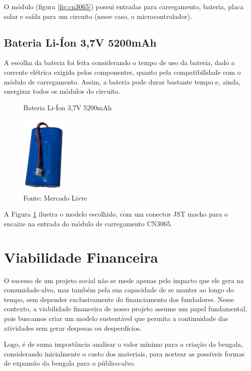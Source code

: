     O módulo (figura \ref{fig:cn3065}) possui entradas para carregamento, bateria, placa solar e saída para um circuito (nesse caso, o microcontrolador). 
    
    \subsection{Bateria Li-Íon 3,7V 5200mAh}
    A escolha da bateria foi feita considerando o tempo de uso da bateria, dado a corrente elétrica exigida pelos componentes, quanto pela compatibilidade com o módulo de carregamento. Assim, a bateria pode durar bastante tempo e, ainda, energizar todos os módulos do circuito.

     \begin{figure}[h!]
        \captionsetup{width=1\textwidth}
        \caption{\label{fig:bateria}Bateria Li-Íon 3,7V 5200mAh}
        \centering
        \includegraphics[width=0.2\textwidth]{figuras/bateria} 
        \caption*{Fonte: Mercado Livre}
    \end{figure}

    A Figura \ref{fig:bateria} ilustra o modelo escolhido, com um conector JST macho para o encaixe na entrada do módulo de carregamento CN3065.

    \section{Viabilidade Financeira}
    O sucesso de um projeto social não se mede apenas pelo impacto que ele gera na comunidade-alvo, mas também pela sua capacidade de se manter ao longo do tempo, sem depender exclusivamente do financiamento dos fundadores. Nesse contexto, a viabilidade financeira de nosso projeto assume um papel fundamental, pois buscamos criar um modelo sustentável que permita a continuidade das atividades sem gerar despesas ou desperdícios.

    Logo, é de suma importância analisar o valor mínimo para a criação da bengala, considerando inicialmente o custo dos materiais, para nortear as possíveis formas de expansão da bengala para o público-alvo.

